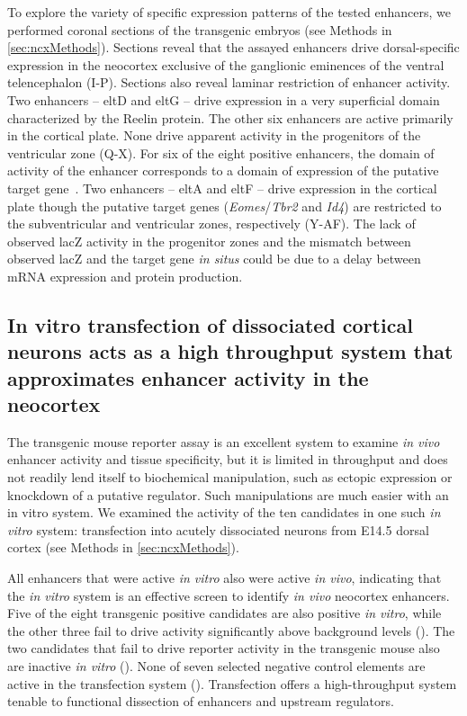 To explore the variety of specific expression patterns of the tested enhancers, we performed coronal sections of the transgenic
embryos (see Methods in \ref{sec:ncxMethods}).  Sections reveal that the assayed enhancers drive dorsal-specific expression in the neocortex exclusive of
the ganglionic eminences of the ventral telencephalon (I-P).  Sections also reveal laminar restriction of enhancer
activity.  Two enhancers -- eltD and eltG -- drive expression in a very superficial domain characterized by the Reelin protein.  The
other six enhancers are active primarily in the cortical plate.  None drive apparent activity in the progenitors of the ventricular
zone (Q-X).  For six of the eight positive enhancers, the domain of activity of the enhancer corresponds to a
domain of expression of the putative target gene~\citep{Science2009}.  Two enhancers -- eltA and eltF -- drive expression in the
cortical plate though the putative target genes (\textit{Eomes}/\textit{Tbr2} and \textit{Id4}) are restricted to the subventricular and ventricular zones,
respectively (Y-AF).  The lack of observed lacZ activity in the progenitor zones and the mismatch between observed
lacZ and the target gene \textit{in situs} could be due to a delay between mRNA expression and protein production.

\subsection{In vitro transfection of dissociated cortical neurons acts as a high throughput system that approximates enhancer activity in the neocortex}
The transgenic mouse reporter assay is an excellent system to examine \textit{in vivo} enhancer activity and tissue specificity, but it is
limited in throughput and does not readily lend itself to biochemical manipulation, such as ectopic expression or knockdown of a
putative regulator.  Such manipulations are much easier with an in vitro system.  We examined the activity of the ten candidates
in one such \textit{in vitro} system: transfection into acutely dissociated neurons from E14.5 dorsal cortex (see Methods in \ref{sec:ncxMethods}).

All enhancers that were active \textit{in vitro} also were active \textit{in vivo}, indicating that the \textit{in vitro} system is an
effective screen to identify \textit{in vivo} neocortex enhancers.  Five of the eight transgenic positive candidates are also positive
\textit{in vitro}, while the other three fail to drive activity significantly above background levels ().
The two candidates that fail to drive reporter activity in the transgenic mouse also are inactive \textit{in vitro} ().
None of seven selected negative control elements are active in the transfection system ().  Transfection offers
a high-throughput system tenable to functional dissection of enhancers and upstream regulators.

